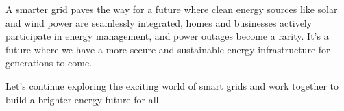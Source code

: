 A smarter grid paves the way for a future where clean energy sources like solar and wind power are seamlessly integrated, homes and businesses actively participate in energy management, and power outages become a rarity. It's a future where we have a more secure and sustainable energy infrastructure for generations to come.

Let's continue exploring the exciting world of smart grids and work together to build a brighter energy future for all.
